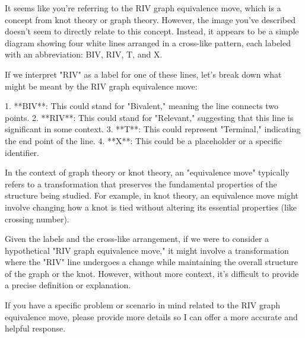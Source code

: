 It seems like you're referring to the RIV graph equivalence move, which is a concept from knot theory or graph theory. However, the image you've described doesn't seem to directly relate to this concept. Instead, it appears to be a simple diagram showing four white lines arranged in a cross-like pattern, each labeled with an abbreviation: BIV, RIV, T, and X.

If we interpret "RIV" as a label for one of these lines, let's break down what might be meant by the RIV graph equivalence move:

1. **BIV**: This could stand for "Bivalent," meaning the line connects two points.
2. **RIV**: This could stand for "Relevant," suggesting that this line is significant in some context.
3. **T**: This could represent "Terminal," indicating the end point of the line.
4. **X**: This could be a placeholder or a specific identifier.

In the context of graph theory or knot theory, an "equivalence move" typically refers to a transformation that preserves the fundamental properties of the structure being studied. For example, in knot theory, an equivalence move might involve changing how a knot is tied without altering its essential properties (like crossing number).

Given the labels and the cross-like arrangement, if we were to consider a hypothetical "RIV graph equivalence move," it might involve a transformation where the "RIV" line undergoes a change while maintaining the overall structure of the graph or the knot. However, without more context, it's difficult to provide a precise definition or explanation.

If you have a specific problem or scenario in mind related to the RIV graph equivalence move, please provide more details so I can offer a more accurate and helpful response.